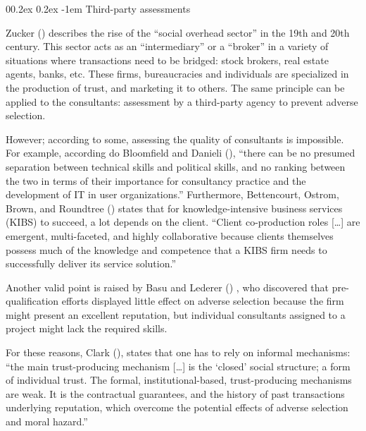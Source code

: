 \documentclass[
  man,floatsintext]{apa6}
\makeatletter
\let\oldparagraph\paragraph
\renewcommand{\paragraph}[1]{\oldparagraph{#1}\mbox{}}
\renewcommand{\paragraph}{\@startsection{paragraph}{4}{\parindent}%
  {0\baselineskip \@plus 0.2ex \@minus 0.2ex}%
  {-1em}%
  {\normalfont\normalsize\bfseries\itshape\typesectitle}}
\makeatother
\begin{document}
\paragraph{Third-party assessments}\label{third-party-assessments}

Zucker () describes the rise of the ``social overhead sector'' in the 19th and 20th century. This sector acts as an ``intermediary'' or a ``broker'' in a variety of situations where transactions need to be bridged: stock brokers, real estate agents, banks, etc. These firms, bureaucracies and individuals are specialized in the production of trust, and marketing it to others. The same principle can be applied to the consultants: assessment by a third-party agency to prevent adverse selection.

However; according to some, assessing the quality of consultants is impossible. For example, according do Bloomfield and Danieli (), ``there can be no presumed separation between technical skills and political skills, and no ranking between the two in terms of their importance for consultancy practice and the development of IT in user organizations.'' Furthermore, Bettencourt, Ostrom, Brown, and Roundtree () states that for knowledge-intensive business services (KIBS) to succeed, a lot depends on the client. ``Client co-production roles {[}\ldots{]} are emergent, multi-faceted, and highly collaborative because clients themselves possess much of the knowledge and competence that a KIBS firm needs to successfully deliver its service solution.''

Another valid point is raised by Basu and Lederer () , who discovered that pre-qualification efforts displayed little effect on adverse selection because the firm might present an excellent reputation, but individual consultants assigned to a project might lack the required skills.

For these reasons, Clark (), states that one has to rely on informal mechanisms: ``the main trust-producing mechanism {[}\ldots{]} is the `closed' social structure; a form of individual trust. The formal, institutional-based, trust-producing mechanisms are weak. It is the contractual guarantees, and the history of past transactions underlying reputation, which overcome the potential effects of adverse selection and moral hazard.''
\end{document}
